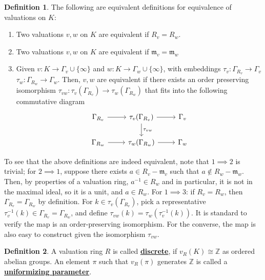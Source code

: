\documentclass{article}
\theoremstyle{definition}
\theoremstyle{definition}
\theoremstyle{definition}
\theoremstyle{definition}
\theoremstyle{definition}
\newtheorem{definition}{Definition}[section]
\theoremstyle{definition}
\theoremstyle{definition}
\begin{document}
\begin{tcolorbox}[colback=purple!5!white,colframe=purple!75!black]
\begin{definition}
    The following are equivalent definitions for equivalence of valuations on $K$: 
    \begin{enumerate}
    \item Two valuations $v,w$ on $K$ are equivalent if $R_v=R_w$. 
   \item  Two valuations $v,w$ on $K$ are equivalent if $\mathfrak{m}_v=\mathfrak{m}_w$
   \item Given $v: K\to \Gamma_v\cup \{\infty\}$ and $w: K\to \Gamma_w\cup \{\infty\}$, with embeddings $\tau_v: \Gamma_{R_v}\to \Gamma_v$ $\tau_w: \Gamma_{R_w}\to \Gamma_w$. Then, $v,w$ are equivalent if there exists an order preserving isomorphism $\tau_{vw}: \tau_v(\Gamma_{R_v})\to \tau_w(\Gamma_{R_w})$ that fits into the following commutative diagram
   \[
   \begin{tikzcd}
   \Gamma_{R_v}\arrow[r]&\tau_v(\Gamma_{R_v})\arrow[d,"\tau_{vw}"]\arrow[r]&\Gamma_v\\
   \Gamma_{R_w}\arrow[r]&\tau_w(\Gamma_{R_w})\arrow[r]&\Gamma_w
   \end{tikzcd}\]
\end{enumerate}
\end{definition}
\end{tcolorbox}
To see that the above definitions are indeed equivalent, note that $1\implies 2$ is trivial; for $2 \implies 1$, suppose there exists $a\in R_v-\mathfrak{m}_v$ such that $a\not \in R_w-\mathfrak{m}_w$. Then, by properties of a valuation ring, $a^{-1}\in R_w$ and in particular, it is not in the maximal ideal, so it is a unit, and $a\in R_w$. For $1\implies 3$: if $R_v=R_w$, then $\Gamma_{R_v}=\Gamma_{R_w}$ by definition. For $k\in \tau_v(\Gamma_{R_v})$, pick a representative $\tau_v ^{-1}(k)\in \Gamma_{R_v}=\Gamma_{R_w}$, and define $\tau_{vw}(k)=\tau_w(\tau_v ^{-1}(k))$. It is standard to verify the map is an order-preserving isomorphism. For the converse, the map is also easy to construct given the isomorphism $\tau_{vw}$. 



\begin{tcolorbox}[colback=purple!5!white,colframe=purple!75!black]
\begin{definition}
    A valuation ring $R$ is called \underline{\textbf{discrete}}, if $v_R(K)\cong \mathbb{Z}$ as ordered abelian groups. An element $\pi$ such that $v_R(\pi)$ generates $\mathbb{Z}$ is called a \underline{\textbf{uniformizing parameter}}.
\end{definition}
\end{tcolorbox}
\end{document}
